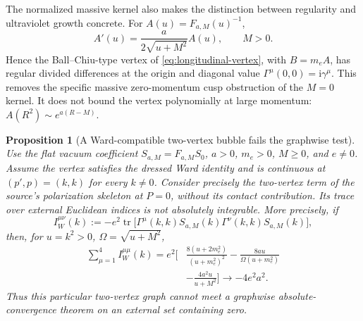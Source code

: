 \documentclass[final,5p,times,twocolumn,numbers,nopreprintline]{elsarticle}
\numberwithin{equation}{section}
\newtheorem{proposition}[theorem]{Proposition}
\theoremstyle{definition}
\theoremstyle{remark}
\newcommand{\ii}{\mathrm i}
\newcommand{\Tr}{\operatorname{tr}}
\begin{document}
The normalized massive kernel also makes the distinction between
regularity and ultraviolet growth concrete. For
\(A(u)=F_{a,M}(u)^{-1}\),
\begin{equation}
 A'(u)=\frac{a}{2\sqrt{u+M^2}}A(u),\qquad M>0.
\label{eq:OQED-inverse-derivative}
\end{equation}
Hence the Ball--Chiu-type vertex of
\eqref{eq:longitudinal-vertex}, with \(B=m_eA\), has regular
divided differences at the origin and diagonal value
\(\Gamma^\mu(0,0)=\ii\gamma^\mu\). This removes the specific
massive zero-momentum cusp obstruction of the \(M=0\) kernel.
It does not bound the vertex polynomially at large momentum:
\(A(R^2)\sim e^{a(R-M)}\).

\begin{proposition}[A Ward-compatible two-vertex bubble fails the graphwise test]
\label{prop:OQED-Ward-bubble-obstruction}
Use the flat vacuum coefficient \(S_{a,M}=F_{a,M}S_0\),
\(a>0\), \(m_e>0\), \(M\geq0\), and \(e\ne0\).
Assume the vertex satisfies the dressed Ward identity and is continuous
at \((p',p)=(k,k)\) for every \(k\ne0\). Consider precisely the
two-vertex term of the source's polarization skeleton at \(P=0\),
without its contact contribution. Its trace over external Euclidean
indices is not absolutely integrable. More precisely, if
\[
 I_W^{\mu\nu}(k):=-e^2\Tr\bigl[
       \Gamma^\mu(k,k)S_{a,M}(k)
       \Gamma^\nu(k,k)S_{a,M}(k)\bigr],
\]
then, for \(u=k^2>0\), \(\Omega=\sqrt{u+M^2}\),
\begin{equation}
\begin{aligned}
 \sum_{\mu=1}^4I_W^{\mu\mu}(k)=e^2\biggl[
 &\frac{8(u+2m_e^2)}{(u+m_e^2)^2}
 -\frac{8a u}{\Omega(u+m_e^2)}\\
 &-\frac{4a^2u}{u+M^2}\biggr]
 \longrightarrow-4e^2a^2 .
\end{aligned}
\label{eq:OQED-Ward-bubble-trace}
\end{equation}
Thus this particular two-vertex graph cannot meet a graphwise
absolute-convergence theorem on an external set containing zero.
\end{proposition}
\end{document}
